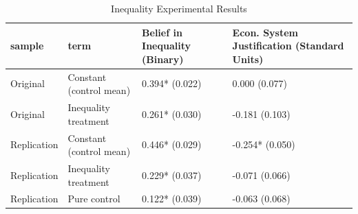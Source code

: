 \begin{table}[!h]
\centering
\caption{\label{tab:inequality}Inequality Experimental Results}
\centering
\begin{tabular}[t]{llll}
\toprule
sample & term & Belief in Inequality (Binary) & Econ. System Justification (Standard Units)\\
\midrule
Original & Constant (control mean) & 0.394*
(0.022) & 0.000
(0.077)\\
Original & Inequality treatment & 0.261*
(0.030) & -0.181
(0.103)\\
Replication & Constant (control mean) & 0.446*
(0.029) & -0.254*
(0.050)\\
Replication & Inequality treatment & 0.229*
(0.037) & -0.071
(0.066)\\
Replication & Pure control & 0.122*
(0.039) & -0.063
(0.068)\\
\bottomrule
\end{tabular}
\end{table}
